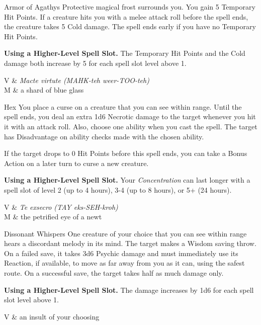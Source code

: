 \begin{Spell}[
  level=1st,
  time=1 Bonus Action,
  range=Self,
  components={V, S, M},
  duration=1 Hour,
  school=Abjuration,
  attack=None,
  effect=Cold
]{Armor of Agathys}
Protective magical frost surrounds you. You gain 5 Temporary Hit Points. If a creature hits you with a melee attack roll before the spell ends, the creature takes 5 Cold damage. The spell ends early if you have no Temporary Hit Points.

\textbf{Using a Higher-Level Spell Slot.} The Temporary Hit Points and the Cold damage both increase by 5 for each spell slot level above 1.

\begin{components}
V & \textit{Macte virtute (MAHK-teh weer-TOO-teh)} \\
M & a shard of blue glass
\end{components}
\end{Spell}


\begin{Spell}[
  tags=Concentration,
  level=1st,
  time=1 Bonus Action,
  range=90 ft,
  components={V, S, M},
  duration=1 Hour,
  school=Enchantment,
  attack=None,
  effect=Necrotic
]{Hex}
You place a curse on a creature that you can see within range. Until the spell ends, you deal an extra 1d6 Necrotic damage to the target whenever you hit it with an attack roll. Also, choose one ability when you cast the spell. The target has Disadvantage on ability checks made with the chosen ability.

If the target drops to 0 Hit Points before this spell ends, you can take a Bonus Action on a later turn to curse a new creature.

\textbf{Using a Higher-Level Spell Slot.} Your \textit{Concentration} can last longer with a spell slot of level 2 (up to 4 hours), 3-4 (up to 8 hours), or 5+ (24 hours).

\begin{components}
V & \textit{Te exsecro (TAY eks-SEH-kroh)} \\
M & the petrified eye of a newt
\end{components}
\end{Spell}


\begin{Spell}[
    level=1st,
    time=1 Action,
    range=60 ft,
    components={V},
    duration=Instantaneous,
    school=Enchantment,
    attack=WIS Save,
    effect=Psychic
]{Dissonant Whispers}
One creature of your choice that you can see within range hears a discordant melody in its mind. The target makes a Wisdom saving throw. On a failed save, it takes 3d6 Psychic damage and must immediately use its Reaction, if available, to move as far away from you as it can, using the safest route. On a successful save, the target takes half as much damage only.

\textbf{Using a Higher-Level Spell Slot.} The damage increases by 1d6 for each spell slot level above 1.

\begin{components}
V & an insult of your choosing
\end{components}
\end{Spell}


